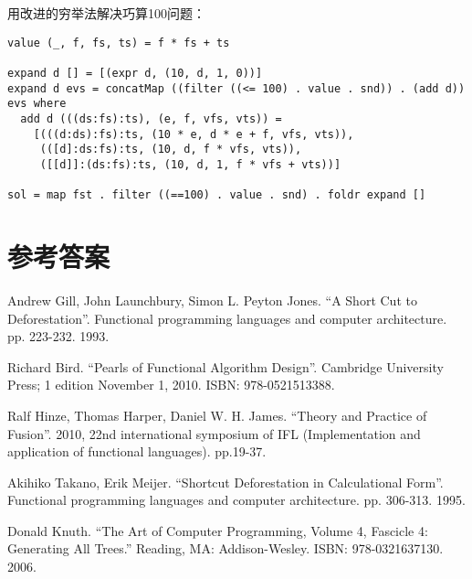 \documentclass[b5paper]{ctexart}
\begin{document}
用改进的穷举法解决巧算100问题：
\begin{lstlisting}
value (_, f, fs, ts) = f * fs + ts

expand d [] = [(expr d, (10, d, 1, 0))]
expand d evs = concatMap ((filter ((<= 100) . value . snd)) . (add d)) evs where
  add d (((ds:fs):ts), (e, f, vfs, vts)) =
    [(((d:ds):fs):ts, (10 * e, d * e + f, vfs, vts)),
     (([d]:ds:fs):ts, (10, d, f * vfs, vts)),
     ([[d]]:(ds:fs):ts, (10, d, 1, f * vfs + vts))]

sol = map fst . filter ((==100) . value . snd) . foldr expand []
\end{lstlisting}

\ifx\wholebook\relax \else
\section{参考答案}
\shipoutAnswer

\begin{thebibliography}{99}

Andrew Gill, John Launchbury, Simon L. Peyton Jones. ``A Short Cut to Deforestation''. Functional programming languages and computer architecture. pp. 223-232. 1993.

Richard Bird. ``Pearls of Functional Algorithm Design''. Cambridge University Press; 1 edition November 1, 2010. ISBN: 978-0521513388.

Ralf Hinze, Thomas Harper, Daniel W. H. James. ``Theory and Practice of Fusion''. 2010, 22nd international symposium of IFL (Implementation and application of functional languages). pp.19-37.

Akihiko Takano, Erik Meijer. ``Shortcut Deforestation in Calculational Form''. Functional programming languages and computer architecture. pp. 306-313. 1995.

Donald Knuth. ``The Art of Computer Programming, Volume 4, Fascicle 4: Generating All Trees.'' Reading, MA: Addison-Wesley. ISBN: 978-0321637130. 2006.

\end{thebibliography}

\expandafter\enddocument

\fi
\end{document}
